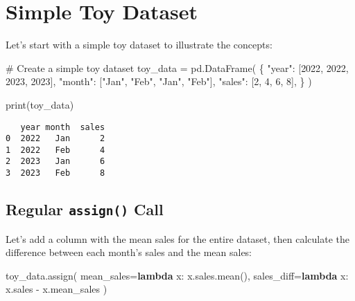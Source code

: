 \documentclass[
  letterpaper,
  DIV=11,
  numbers=noendperiod]{scrreprt}
\newenvironment{Shaded}{\begin{snugshade}}{\end{snugshade}}
\newcommand{\BuiltInTok}[1]{\textcolor[rgb]{0.00,0.23,0.31}{#1}}
\newcommand{\CommentTok}[1]{\textcolor[rgb]{0.37,0.37,0.37}{#1}}
\newcommand{\DecValTok}[1]{\textcolor[rgb]{0.68,0.00,0.00}{#1}}
\newcommand{\KeywordTok}[1]{\textcolor[rgb]{0.00,0.23,0.31}{\textbf{#1}}}
\newcommand{\NormalTok}[1]{\textcolor[rgb]{0.00,0.23,0.31}{#1}}
\newcommand{\OperatorTok}[1]{\textcolor[rgb]{0.37,0.37,0.37}{#1}}
\newcommand{\StringTok}[1]{\textcolor[rgb]{0.13,0.47,0.30}{#1}}
\begin{document}
\section{Simple Toy Dataset}\label{simple-toy-dataset}

Let's start with a simple toy dataset to illustrate the concepts:

\begin{Shaded}
\begin{Highlighting}[]
\CommentTok{\# Create a simple toy dataset}
\NormalTok{toy\_data }\OperatorTok{=}\NormalTok{ pd.DataFrame(}
\NormalTok{    \{}
        \StringTok{"year"}\NormalTok{: [}\DecValTok{2022}\NormalTok{, }\DecValTok{2022}\NormalTok{, }\DecValTok{2023}\NormalTok{, }\DecValTok{2023}\NormalTok{],}
        \StringTok{"month"}\NormalTok{: [}\StringTok{"Jan"}\NormalTok{, }\StringTok{"Feb"}\NormalTok{, }\StringTok{"Jan"}\NormalTok{, }\StringTok{"Feb"}\NormalTok{],}
        \StringTok{"sales"}\NormalTok{: [}\DecValTok{2}\NormalTok{, }\DecValTok{4}\NormalTok{, }\DecValTok{6}\NormalTok{, }\DecValTok{8}\NormalTok{],}
\NormalTok{    \}}
\NormalTok{)}

\BuiltInTok{print}\NormalTok{(toy\_data)}
\end{Highlighting}
\end{Shaded}

\begin{verbatim}
   year month  sales
0  2022   Jan      2
1  2022   Feb      4
2  2023   Jan      6
3  2023   Feb      8
\end{verbatim}

\subsection{\texorpdfstring{Regular \texttt{assign()}
Call}{Regular assign() Call}}\label{regular-assign-call}

Let's add a column with the mean sales for the entire dataset, then
calculate the difference between each month's sales and the mean sales:

\begin{Shaded}
\begin{Highlighting}[]
\NormalTok{toy\_data.assign(}
\NormalTok{    mean\_sales}\OperatorTok{=}\KeywordTok{lambda}\NormalTok{ x: x.sales.mean(), }
\NormalTok{    sales\_diff}\OperatorTok{=}\KeywordTok{lambda}\NormalTok{ x: x.sales }\OperatorTok{{-}}\NormalTok{ x.mean\_sales}
\NormalTok{)}
\end{Highlighting}
\end{Shaded}
\end{document}
